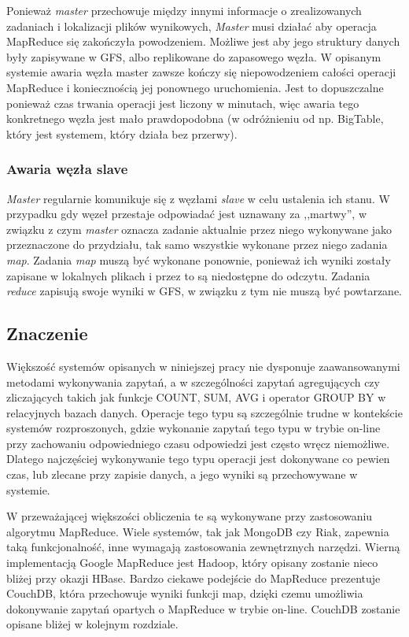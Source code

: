 Ponieważ \emph{master} przechowuje między innymi informacje o zrealizowanych zadaniach i lokalizacji plików wynikowych, \emph{Master} musi działać aby operacja MapReduce się zakończyła powodzeniem.
Możliwe jest aby jego struktury danych były zapisywane w GFS, albo replikowane do zapasowego węzła.
W opisanym systemie awaria węzła master zawsze kończy się niepowodzeniem całości operacji MapReduce i koniecznością jej ponownego uruchomienia.
Jest to dopuszczalne ponieważ czas trwania operacji jest liczony w minutach, więc awaria tego konkretnego węzła jest mało prawdopodobna (w odróżnieniu od np. BigTable, który jest systemem, który działa bez przerwy).

\subsubsection*{Awaria węzła slave}

\emph{Master} regularnie komunikuje się z węzłami \emph{slave} w celu ustalenia ich stanu.
W przypadku gdy węzeł przestaje odpowiadać jest uznawany za ,,martwy'', w związku z czym \emph{master} oznacza zadanie aktualnie przez niego wykonywane jako przeznaczone do przydziału, tak samo wszystkie wykonane przez niego zadania \emph{map}.
Zadania \emph{map} muszą być wykonane ponownie, ponieważ ich wyniki zostały zapisane w lokalnych plikach i przez to są niedostępne do odczytu.
Zadania \emph{reduce} zapisują swoje wyniki w GFS, w związku z tym nie muszą być powtarzane. 

\subsection*{Znaczenie}

Większość systemów opisanych w niniejszej pracy nie dysponuje zaawansowanymi metodami wykonywania zapytań, a w szczególności zapytań agregujących czy zliczających takich jak funkcje COUNT, SUM, AVG i operator GROUP BY w relacyjnych bazach danych.
Operacje tego typu są szczególnie trudne w kontekście systemów rozproszonych, gdzie wykonanie zapytań tego typu w trybie on-line przy zachowaniu odpowiedniego czasu odpowiedzi jest często wręcz niemożliwe.
Dlatego najczęściej wykonywanie tego typu operacji jest dokonywane co pewien czas, lub zlecane przy zapisie danych, a jego wyniki są przechowywane w systemie.

W przeważającej większości obliczenia te są wykonywane przy zastosowaniu algorytmu MapReduce.
Wiele systemów, tak jak MongoDB czy Riak, zapewnia taką funkcjonalność, inne wymagają zastosowania zewnętrznych narzędzi.
Wierną implementacją Google MapReduce jest Hadoop, który opisany zostanie nieco bliżej przy okazji HBase.
Bardzo ciekawe podejście do MapReduce prezentuje CouchDB, która przechowuje wyniki funkcji map, dzięki czemu umożliwia dokonywanie zapytań opartych o MapReduce w trybie on-line.
CouchDB zostanie opisane bliżej w kolejnym rozdziale.


